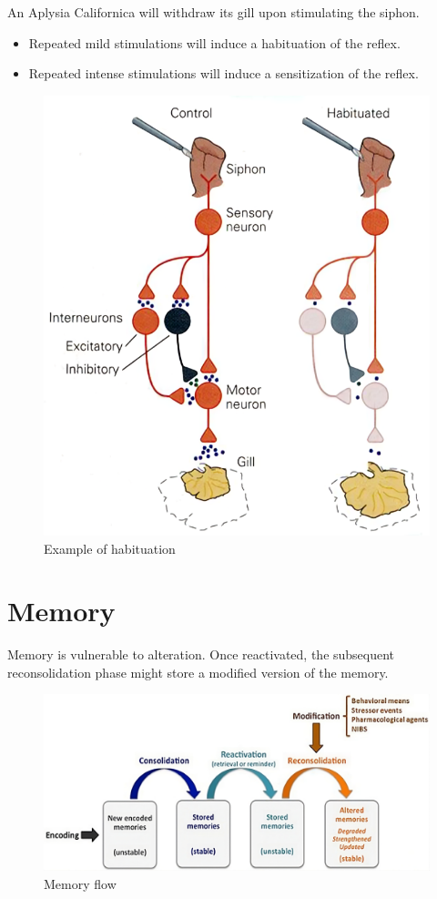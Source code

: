 \begin{example}
    An Aplysia Californica will withdraw its gill upon stimulating the siphon.
    \begin{itemize}
        \item Repeated mild stimulations will induce a habituation of the reflex.
        \item Repeated intense stimulations will induce a sensitization of the reflex.
    \end{itemize}

    \begin{figure}[H]
        \centering
        \includegraphics[width=0.4\linewidth]{./img/gill_habituation.png}
        \caption{Example of habituation}
    \end{figure}
\end{example}



\section{Memory}

Memory is vulnerable to alteration.
Once reactivated, the subsequent reconsolidation phase might store a modified version of the memory.

\begin{figure}[H]
    \centering
    \includegraphics[width=0.7\linewidth]{./img/memory.png}
    \caption{Memory flow}
\end{figure}

